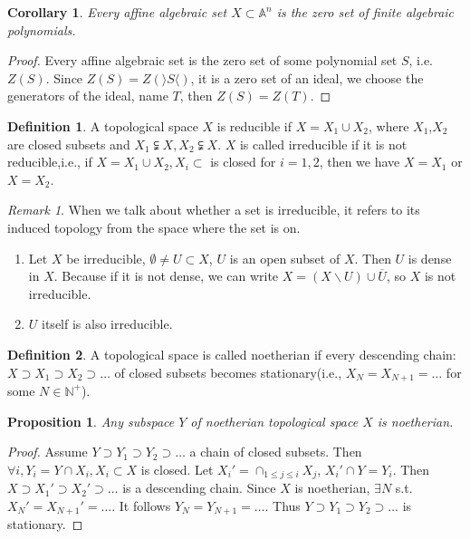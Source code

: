 \documentclass{amsart}
\theoremstyle{plain}
\newtheorem{corollary}{Corollary}
\newtheorem{proposition}{Proposition}
\theoremstyle{definition}
\newtheorem{definition}{Definition}
\theoremstyle{remark}
\newtheorem*{remark}{Remark}
\numberwithin{equation}{section}
\begin{document}
\begin{corollary}
	Every affine algebraic set $ X\subset \mathbb{A}^n $ is the zero set of finite algebraic polynomials. 
\end{corollary}
\begin{proof}
	Every affine algebraic set is the zero set of some polynomial set $ S $, i.e. $ Z(S) $. Since $ Z(S)=Z(\rangle S \langle) $, it is a zero set of an ideal, we choose the generators of the ideal, name $ T $, then $ Z(S)=Z(T) $.
\end{proof}
\begin{definition}
	A topological space $ X $ is reducible if $ X=X_1\cup X_2 $, where $ X_1 $,$ X_2 $ are closed subsets and $ X_1\subsetneqq X,X_2\subsetneqq X $. $ X $ is called irreducible if it is not reducible,i.e., if $ X=X_1\cup X_2, X_i\subset  $ is closed for $ i=1,2 $, then we have $ X=X_1 $ or $ X=X_2 $.
\end{definition}
\begin{remark}
	When we talk about whether a set is irreducible, it refers to its induced topology from the space where the set is on. 
	\begin{enumerate}
		\item Let $ X $ be irreducible, $ \emptyset\neq U\subset X $, $ U $ is an open subset of $ X $. Then $ U $ is dense in $ X $. Because if it is not dense, we can write $ X=(X\backslash U )\cup \overline{U} $, so $ X $ is not irreducible.
		\item $ U $ itself is also irreducible.
	\end{enumerate}
\end{remark}
\begin{definition}
	A topological space is called noetherian if every descending chain:$ X\supset X_1\supset X_2\supset \dots $ of closed subsets becomes stationary(i.e., $ X_N=X_{N+1}=\dots $ for some $ N\in \mathbb{N}^+ $).
\end{definition}
\begin{proposition}
	Any subspace $ Y $ of noetherian topological space $ X $ is noetherian.
\end{proposition}
\begin{proof}
	Assume $ Y\supset Y_1\supset Y_2\supset \dots $ a chain of closed subsets.
	Then $ \forall i, Y_i=Y\cap X_i, X_i\subset X $ is closed.
	Let $ X_{i}' = \cap_{1\leq j \leq i} X_j $, $ X_i'\cap Y = Y_i $. Then $ X\supset X_1'\supset X_2'\supset \dots $ is a descending chain. Since $ X $ is noetherian, $ \exists N $ s.t. $ X_N'=X_{N+1}'=\dots $. It follows $ Y_N=Y_{N+1}=\dots $. Thus $ Y\supset Y_1\supset Y_2\supset \dots $ is stationary. 
\end{proof}
\end{document}
